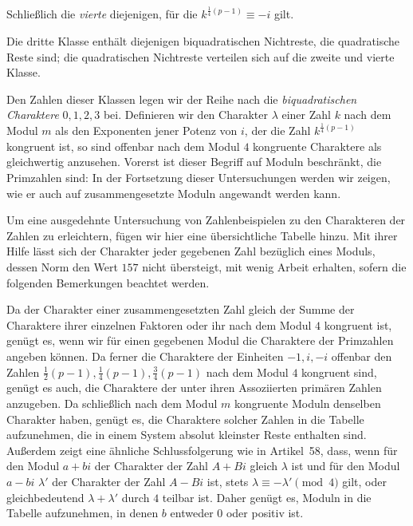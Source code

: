 Schließlich die \emph{vierte} diejenigen, für die $k^{\frac14(p-1)}\equiv-i$ gilt.

Die dritte Klasse enthält diejenigen biquadratischen Nichtreste, die quadratische Reste sind; die quadratischen Nichtreste verteilen sich auf die zweite und vierte Klasse.

Den Zahlen dieser Klassen legen wir der Reihe nach die \emph{biquadratischen Charaktere} $0,1,2,3$ bei. Definieren wir den Charakter $\lambda$ einer Zahl $k$ nach dem Modul $m$ als den Exponenten jener Potenz von $i$, der die Zahl $k^{\frac14(p-1)}$ kongruent ist, so sind offenbar nach dem Modul $4$ kongruente Charaktere als gleichwertig anzusehen. Vorerst ist dieser Begriff auf Moduln beschränkt, die Primzahlen sind: In der Fortsetzung dieser Untersuchungen werden wir zeigen, wie er auch auf zusammengesetzte Moduln angewandt werden kann.

Um eine ausgedehnte Untersuchung von Zahlenbeispielen zu den Charakteren der Zahlen zu erleichtern, fügen wir hier eine übersichtliche Tabelle hinzu. Mit ihrer Hilfe lässt sich der Charakter jeder gegebenen Zahl bezüglich eines Moduls, dessen Norm den Wert $157$ nicht übersteigt, mit wenig Arbeit erhalten, sofern die folgenden Bemerkungen beachtet werden.

%
Da der Charakter einer zusammengesetzten Zahl gleich der Summe der Charaktere ihrer einzelnen Faktoren oder ihr nach dem Modul $4$ kongruent ist, genügt es, wenn wir für einen gegebenen Modul die Charaktere der Primzahlen angeben können. Da ferner die Charaktere der Einheiten $-1,i,-i$ offenbar den Zahlen $\frac12(p-1),\frac14(p-1),\frac34(p-1)$ nach dem Modul $4$ kongruent sind, genügt es auch, die Charaktere der unter ihren Assoziierten primären Zahlen anzugeben. Da schließlich nach dem Modul $m$ kongruente Moduln denselben Charakter haben, genügt es, die Charaktere solcher Zahlen in die Tabelle aufzunehmen, die in einem System absolut kleinster Reste enthalten sind. Außerdem zeigt eine ähnliche Schlussfolgerung wie in Artikel~58, dass, wenn für den Modul $a+bi$ der Charakter der Zahl $A+Bi$ gleich $\lambda$ ist und für den Modul $a-bi$ $\lambda'$ der Charakter der Zahl $A-Bi$ ist, stets $\lambda\equiv-\lambda'\pmod4$ gilt, oder gleichbedeutend $\lambda+\lambda'$ durch $4$ teilbar ist. Daher genügt es, Moduln in die Tabelle aufzunehmen, in denen $b$ entweder $0$ oder positiv ist.

